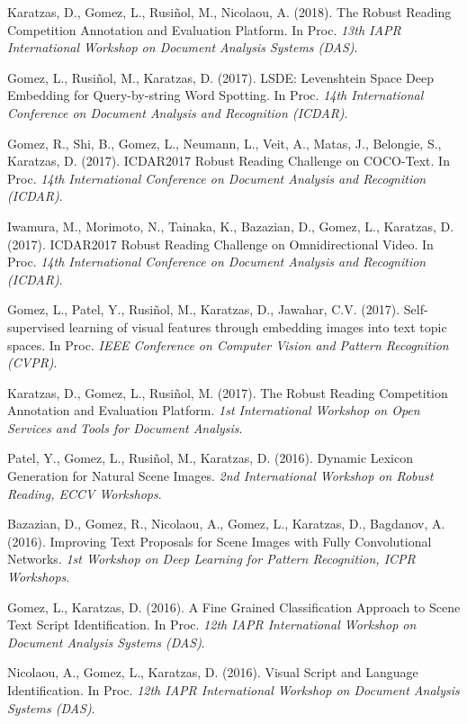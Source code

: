 \documentclass[11pt]{article}
\newcommand{\venue}[1]{\textit{#1}}
\begin{document}
\begin{pubs}
\item Karatzas, D., Gomez, L., Rusiñol, M., Nicolaou, A. (2018). The Robust Reading Competition Annotation and Evaluation Platform. In Proc. \venue{13th IAPR International Workshop on Document Analysis Systems (DAS)}.
\item Gomez, L., Rusiñol, M., Karatzas, D. (2017). LSDE: Levenshtein Space Deep Embedding for Query-by-string Word Spotting. In Proc. \venue{14th International Conference on Document Analysis and Recognition (ICDAR)}.
\item Gomez, R., Shi, B., Gomez, L., Neumann, L., Veit, A., Matas, J., Belongie, S., Karatzas, D. (2017). ICDAR2017 Robust Reading Challenge on COCO-Text. In Proc. \venue{14th International Conference on Document Analysis and Recognition (ICDAR)}.
\item Iwamura, M., Morimoto, N., Tainaka, K., Bazazian, D., Gomez, L., Karatzas, D. (2017). ICDAR2017 Robust Reading Challenge on Omnidirectional Video. In Proc. \venue{14th International Conference on Document Analysis and Recognition (ICDAR)}.
\item Gomez, L., Patel, Y., Rusiñol, M., Karatzas, D., Jawahar, C.V. (2017). Self-supervised learning of visual features through embedding images into text topic spaces. In Proc. \venue{IEEE Conference on Computer Vision and Pattern Recognition (CVPR)}.
\item Karatzas, D., Gomez, L., Rusiñol, M. (2017). The Robust Reading Competition Annotation and Evaluation Platform. \venue{1st International Workshop on Open Services and Tools for Document Analysis}.
\item Patel, Y., Gomez, L., Rusiñol, M., Karatzas, D. (2016). Dynamic Lexicon Generation for Natural Scene Images. \venue{2nd International Workshop on Robust Reading, ECCV Workshops}.
\item Bazazian, D., Gomez, R., Nicolaou, A., Gomez, L., Karatzas, D., Bagdanov, A. (2016). Improving Text Proposals for Scene Images with Fully Convolutional Networks. \venue{1st Workshop on Deep Learning for Pattern Recognition, ICPR Workshops}.
\item Gomez, L., Karatzas, D. (2016). A Fine Grained Classification Approach to Scene Text Script Identification. In Proc. \venue{12th IAPR International Workshop on Document Analysis Systems (DAS)}.
\item Nicolaou, A., Gomez, L., Karatzas, D. (2016). Visual Script and Language Identification. In Proc. \venue{12th IAPR International Workshop on Document Analysis Systems (DAS)}.

\end{pubs}
\end{document}
